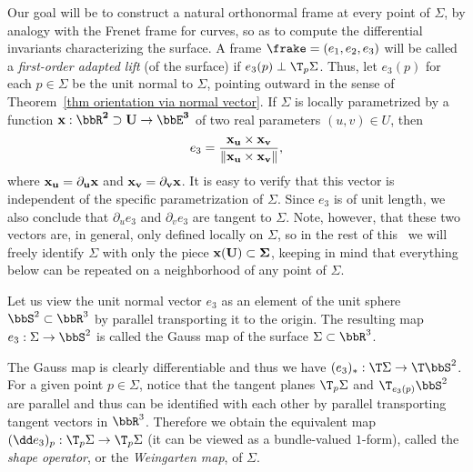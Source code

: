 Our goal will be to construct a natural orthonormal frame at every point of $\Sigma$, by analogy with the Frenet frame for curves, so as to compute the differential invariants characterizing the surface. A frame $\frake=(e_1,e_2,e_3)$ will be called a \emph{first-order adapted lift} (of the surface) if $e_3(p)\perp \T_p \Sigma$. 
Thus, let $e_3(p)$ for each $p\in\Sigma$ be the unit normal to $\Sigma$, pointing outward in the sense of Theorem~\ref{thm orientation via normal vector}.  If $\Sigma$ is locally parametrized by a function $\bf{ x}: \bbR^2\supset U\to\bbE^3$ of two real parameters $(u,v)\in U$, then 
\[e_3=\frac{\bf{ x}_u\times \bf{x}_v}{\lVert \bf{x}_u\times \bf{x}_v\rVert},\]
where $\bf{x}_u=\partial_u \bf{x}$ and $\bf{x}_v=\partial_v \bf{x}$. It is easy to verify that this vector is independent of the specific parametrization of $\Sigma$. Since $e_3$ is of unit length, we also conclude that $\partial_u e_3$ and $\partial_v e_3$ are tangent to $\Sigma$. Note, however, that these two vectors are, in general, only defined locally on $\Sigma$, so in the rest of this \sect\ we will freely identify $\Sigma$ with only the piece $\bf{x}(U)\subset \Sigma$, keeping in mind that everything below can be repeated on a neighborhood of any point of $\Sigma$.

\begin{defn}
    Let us view the unit normal vector $e_3$ as an element of the unit sphere $\bbS^2\subset\bbR^3$ by parallel transporting it to the origin. The resulting map $e_3:\Sigma\to \bbS^2$ is called the Gauss map of the surface $\Sigma\subset \bbR^3$.
\end{defn}

The Gauss map is clearly differentiable and thus we have $(e_3)_\ast:\T\Sigma\to \T\bbS^2$. For a given point $p\in\Sigma$, notice that the tangent planes $\T_p\Sigma$ and $\T_{e_3(p)}\bbS^2$ are parallel and thus can be identified with each other by parallel transporting tangent vectors in $\bbR^3$. Therefore we obtain the equivalent map $(\dd e_3)_{p}:\T_p\Sigma\to \T_p\Sigma$ (it can be viewed as a bundle-valued $1$-form), called the \emph{shape operator}, or the \emph{Weingarten map}, of $\Sigma$.


